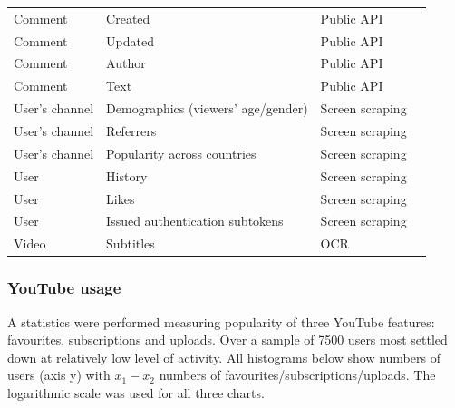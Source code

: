 \documentclass{article}
\begin{document}
\begin{tabular}{l p{3cm} l p{4cm}}
Comment & Created & Public API \\
Comment & Updated & Public API \\
Comment & Author & Public API \\
Comment & Text & Public API \\

User's channel & Demographics (viewers' age/gender) & Screen scraping \\
User's channel & Referrers & Screen scraping \\
User's channel & Popularity across countries & Screen scraping \\
User & History & Screen scraping \\
User & Likes & Screen scraping \\
User & Issued authentication subtokens & Screen scraping \\

Video & Subtitles & OCR \\

\end{tabular}

\subsubsection{YouTube usage}

A statistics were performed measuring popularity of three YouTube features: favourites,
subscriptions and uploads. Over a sample of 7500 users most settled down at
relatively low level of activity. All histograms below show numbers of users
(axis y) with $x_1-x_2$ numbers of favourites/subscriptions/uploads. The
logarithmic scale was used for all three charts.
\end{document}
